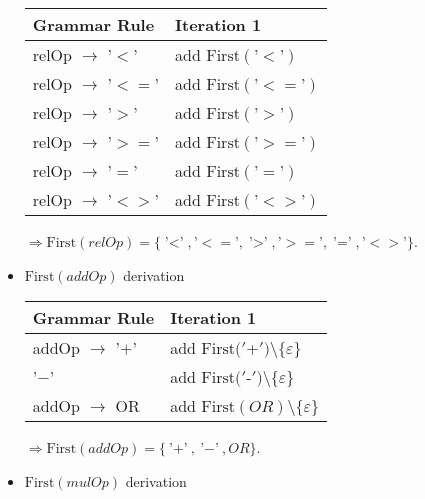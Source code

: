 \documentclass[8pt]{scrartcl}
\newcommand{\First}[1]{\mathrm{First}(#1)}
\newcommand{\epsset}{\{\varepsilon\}}
\begin{document}
\begin{itemize}
                \begin{tabular}{|l |l |}
                    \hline
                    \textbf{Grammar Rule} & \textbf{Iteration 1}\\
                    \hline
                    relOp $\rightarrow$ '$<$' & add $\First{\text{'$<$'}}$\\
                    \hline
                    relOp $\rightarrow$ '$<=$' & add $\First{\text{'$<=$'}}$\\
                    \hline
                    relOp $\rightarrow$ '$>$' & add $\First{\text{'$>$'}}$\\
                    \hline
                    relOp $\rightarrow$ '$>=$' & add $\First{\text{'$>=$'}}$\\
                    \hline
                    relOp $\rightarrow$ '$=$' & add $\First{\text{'$=$'}}$\\
                    \hline
                    relOp $\rightarrow$ '$<>$' & add $\First{\text{'$<>$'}}$\\
                    \hline
                \end{tabular}\newline
                $\Rightarrow \First{relOp} = \{\text{'$<$'}, \text{'$<=$'}, \text{'$>$'}, \text{'$>=$'}, \text{'$=$'}, \text{'$<>$'}\}$.
            \item $\First{addOp}$ derivation\newline
                \begin{tabular}{|l |l |}
                    \hline
                    \textbf{Grammar Rule} & \textbf{Iteration 1}\\
                    \hline
                    addOp $\rightarrow$ '$+$' & add $\First{'$+$'} \setminus \epsset$\\
                    \hline
                    '$-$' & add $\First{'$-$'} \setminus \epsset$\\
                    \hline
                    addOp $\rightarrow$ OR & add $\First{OR} \setminus \epsset$\\
                    \hline
                \end{tabular}\newline
                $\Rightarrow \First{addOp} = \{\text{'$+$'}, \text{'$-$'}, OR\}$.
            \item $\First{mulOp}$ derivation\newline
                \begin{tabular}{|l |l |}
                    \hline

\end{tabular}
\end{itemize}
\end{document}
